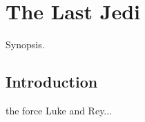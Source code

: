 \chapter{The Last Jedi}
	\label{chapter:last-jedi}%



\begin{synopsis}
	Synopsis.
\end{synopsis}


\section{Introduction}

 the force Luke and Rey...

